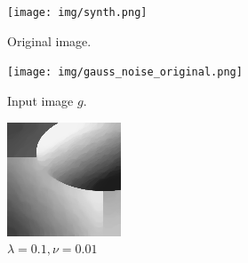 \documentclass{scrreprt}
\begin{document}
            \begin{figure}[!ht]
                \centering
                \begin{subfigure}[b]{0.22\textwidth}
                    \texttt{[image: img/synth.png]}
                    \caption{Original image.}
                \end{subfigure}
                \begin{subfigure}[b]{0.22\textwidth}
                    \texttt{[image: img/gauss\_noise\_original.png]}
                    \caption{Input image $g$.}
                \end{subfigure}
                \begin{subfigure}[b]{0.22\textwidth}
                    \includegraphics[width=\textwidth]{img/dykstra/synth_gauss.png}
                    \caption{$\lambda = 0.1, \nu = 0.01$}
                \end{subfigure}
                \begin{subfigure}[b]{0.22\textwidth}

\end{subfigure}
\end{figure}
\end{document}
